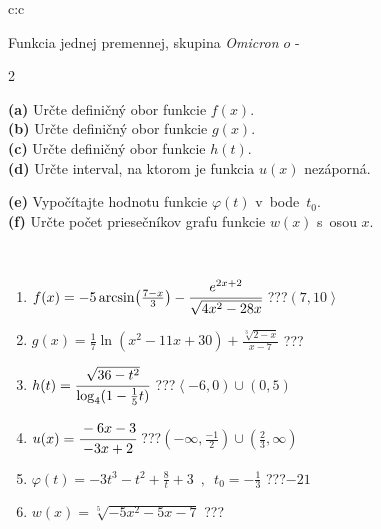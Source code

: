 \documentclass[10pt]{report}
\newcommand\omicron{o}
\begin{document}
\begin{tabular}{c:c}
\begin{minipage}[c][104.5mm][t]{0.5\linewidth}
\begin{center}
\vspace{7mm}
{\huge Funkcia jednej premennej, skupina \textit{Omicron $\omicron$} -}\\[5mm]
\begin{minipage}{0.95\linewidth}
\begin{center}
{\small \begin{multicols}{2} \raggedright
\textbf{(a)} Určte definičný obor funkcie \(f(x)\). \\[1mm]
\textbf{(b)} Určte definičný obor funkcie \(g(x)\). \\[1mm]
\textbf{(c)} Určte definičný obor funkcie \(h(t)\). \\[1mm]
\textbf{(d)} Určte interval, na ktorom je funkcia \(u(x)\) nezáporná. \par \columnbreak
\textbf{(e)} Vypočítajte hodnotu funkcie \(\varphi(t)\) v~bode~\(t_0\). \\[1mm]
\textbf{(f)} Určte počet priesečníkov grafu funkcie \(w(x)\) s~osou \(x\). \\[1mm]
\end{multicols}
}
\end{center}
\end{minipage}
\\[4mm]
\begin{minipage}{0.79\linewidth}
\begin{center}
\begin{varwidth}{\linewidth}
\begin{enumerate}
\small
\item $f(x) = -5\arcsin\!\left( \frac{7-x}{3} \right) - \cfrac{e^{2x+2}}{\sqrt{4x^2-28x}}$\quad \dotfill\; ???\;\dotfill \quad $\left(7 , 10\right\rangle$
\item $g(x) = \frac{1}{7} \ln{\!(x^2-11x+30)}+\frac{\sqrt[3]{2-x}}{x-7}$\quad \dotfill\; ???\;\dotfill {}
\item $h(t) = \cfrac{\sqrt{36-t^2}}{\log_4(1-\frac{1}{5}t)}$\quad \dotfill\; ???\;\dotfill \quad $\left\langle-6 , 0\right)\cup\left(0 , 5\right)$
\item $u(x) = \cfrac{-6x-3}{-3x+2}$\quad \dotfill\; ???\;\dotfill \quad $\left(-\infty , \frac{-1}{2}\right)\cup\left(\frac{2}{3} , \infty\right)$
\item $\varphi(t) = -3t^3-t^2+\frac{8}{t}+3 \enspace , \enspace t_0=-\frac{1}{3}$\quad \dotfill\; ???\;\dotfill \quad $-21$
\item $w(x) = \sqrt[5]{-5x^2-5x-7}$\quad \dotfill\; ???\;\dotfill {}

\end{enumerate}
\end{varwidth}
\end{center}
\end{minipage}
\end{center}
\end{minipage}
\end{tabular}
\end{document}
